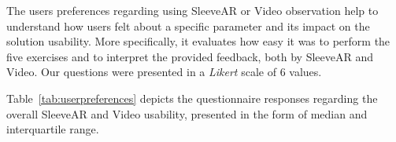 \begin{table}[!t]
\centering
{}
\caption{Questionnaire results}
\label{tab:userpreferences}
\end{table}


The users preferences regarding using SleeveAR or Video observation help to understand how users felt about a specific parameter and its impact on the solution usability. 
More specifically, it evaluates how easy it was to perform the five exercises and to interpret the provided feedback, both by SleeveAR and Video.
Our questions were presented in a \textit{Likert} scale of 6 values.

Table~\ref{tab:userpreferences} depicts the questionnaire responses regarding the overall SleeveAR and Video usability, presented in the form of median and interquartile range. 

